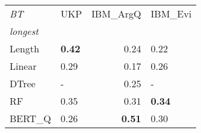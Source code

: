 \begin{tabular}{llrl}
\toprule
\textit{BT} &   UKP &  IBM\_ArgQ & IBM\_Evi \\
\textit{longest}  &       &           &         \\
\midrule
Length &  \textbf{0.42} &      0.24 &    0.22 \\
Linear &  0.29 &      0.17 &    0.26 \\
DTree  &     - &      0.25 &       - \\
RF     &  0.35 &      0.31 &    \textbf{0.34} \\
BERT\_Q &  0.26 &      \textbf{0.51} &     0.30 \\
\bottomrule
\end{tabular}
